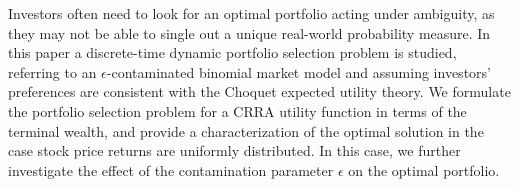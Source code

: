 
Investors often need to look for an optimal portfolio acting under ambiguity, as they may not be able to single out a unique real-world probability measure. In this paper a discrete-time dynamic portfolio selection problem is studied, referring to an $\epsilon$-contaminated binomial market model and assuming investors' preferences
are consistent with the Choquet expected utility theory.  We formulate the portfolio selection problem for a CRRA utility function in terms of the terminal wealth, and provide a characterization of the optimal solution in the case stock price returns are uniformly distributed. In this case, we further
investigate the effect of the contamination parameter $\epsilon$ on the optimal portfolio.

